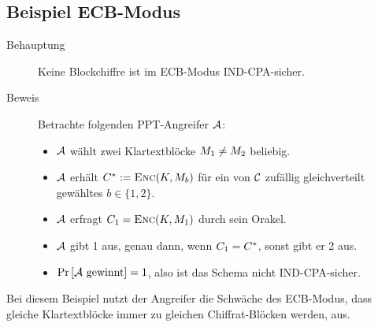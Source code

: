 \subsection{Beispiel ECB-Modus}
\begin{description} 
	\item[Behauptung] Keine Blockchiffre ist im ECB-Modus IND-CPA-sicher.
	\item[Beweis] Betrachte folgenden PPT-Angreifer $\mathcal{A}$:
	\begin{itemize}
		\item $\mathcal{A}$ wählt zwei Klartextblöcke $M_1 \neq M_2$ beliebig.
		\item $\mathcal{A}$ erhält  $C^{*} := \textsc{Enc}(K, M_{b})$ für ein von $\mathcal{C}$ zufällig gleichverteilt gewähltes $b \in \{1, 2\}$.
		\item $\mathcal{A}$ erfragt $C_1 = \textsc{Enc}(K, M_1)$ durch sein Orakel.
		\item $\mathcal{A}$ gibt 1 aus, genau dann, wenn $C_1 = C^{*}$, sonst gibt er 2 aus.
		\item $\Pr \left[ \mathcal{A} \text{ gewinnt} \right] = 1$, also ist das Schema nicht IND-CPA-sicher.
	\end{itemize}
\end{description}
Bei diesem Beispiel nutzt der Angreifer die Schwäche des ECB-Modus, dass gleiche Klartextblöcke immer zu gleichen Chiffrat-Blöcken werden, aus.

